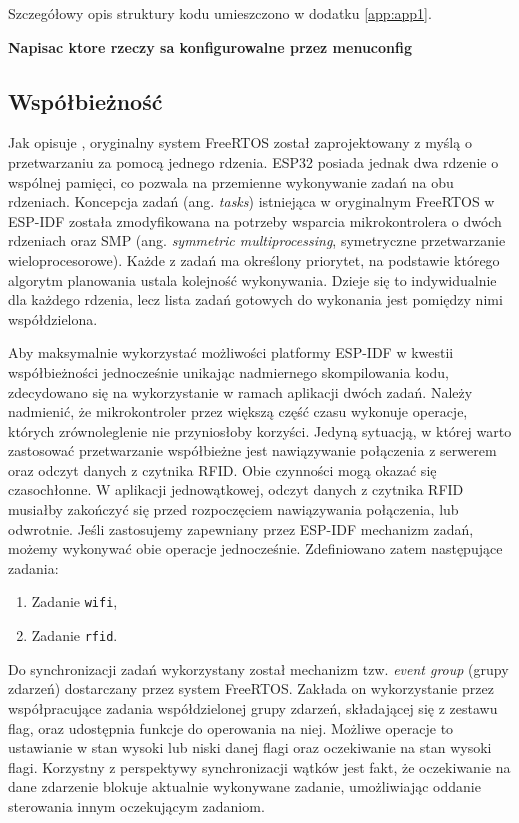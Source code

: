             Szczegółowy opis struktury kodu umieszczono w dodatku \ref{app:app1}.

            \textbf{Napisac ktore rzeczy sa konfigurowalne przez menuconfig}

        \subsection{Współbieżność}
        \label{sub:tasks}

            Jak opisuje \cite{esp-idf-freertos-smp-changes}, oryginalny system FreeRTOS został zaprojektowany z myślą o przetwarzaniu za pomocą jednego rdzenia. ESP32 posiada jednak dwa rdzenie o wspólnej pamięci, co pozwala na przemienne wykonywanie zadań na obu rdzeniach. Koncepcja zadań (ang. \textit{tasks}) istniejąca w oryginalnym FreeRTOS w ESP-IDF została zmodyfikowana na potrzeby wsparcia mikrokontrolera o dwóch rdzeniach oraz SMP (ang. \textit{symmetric multiprocessing}, symetryczne przetwarzanie wieloprocesorowe). Każde z zadań ma określony priorytet, na podstawie którego algorytm planowania ustala kolejność wykonywania. Dzieje się to indywidualnie dla każdego rdzenia, lecz lista zadań gotowych do wykonania jest pomiędzy nimi współdzielona.

            Aby maksymalnie wykorzystać możliwości platformy ESP-IDF w kwestii współbieżności jednocześnie unikając nadmiernego skompilowania kodu, zdecydowano się na wykorzystanie w ramach aplikacji dwóch zadań. Należy nadmienić, że mikrokontroler przez większą część czasu wykonuje operacje, których zrównoleglenie nie przyniosłoby korzyści. Jedyną sytuacją, w której warto zastosować przetwarzanie współbieżne jest nawiązywanie połączenia z serwerem oraz odczyt danych z czytnika RFID. Obie czynności mogą okazać się czasochłonne. W aplikacji jednowątkowej, odczyt danych z czytnika RFID musiałby zakończyć się przed rozpoczęciem nawiązywania połączenia, lub odwrotnie. Jeśli zastosujemy zapewniany przez ESP-IDF mechanizm zadań, możemy wykonywać obie operacje jednocześnie. Zdefiniowano zatem następujące zadania:

            \begin{enumerate}
                \item Zadanie \texttt{wifi},
                \item Zadanie \texttt{rfid}.
            \end{enumerate}

            Do synchronizacji zadań wykorzystany został mechanizm tzw. \textit{event group} (grupy zdarzeń) dostarczany przez system FreeRTOS. Zakłada on wykorzystanie przez współpracujące zadania współdzielonej grupy zdarzeń, składającej się z zestawu flag, oraz udostępnia funkcje do operowania na niej. Możliwe operacje to ustawianie w stan wysoki lub niski danej flagi oraz oczekiwanie na stan wysoki flagi. Korzystny z perspektywy synchronizacji wątków jest fakt, że oczekiwanie na dane zdarzenie blokuje aktualnie wykonywane zadanie, umożliwiając oddanie sterowania innym oczekującym zadaniom.

